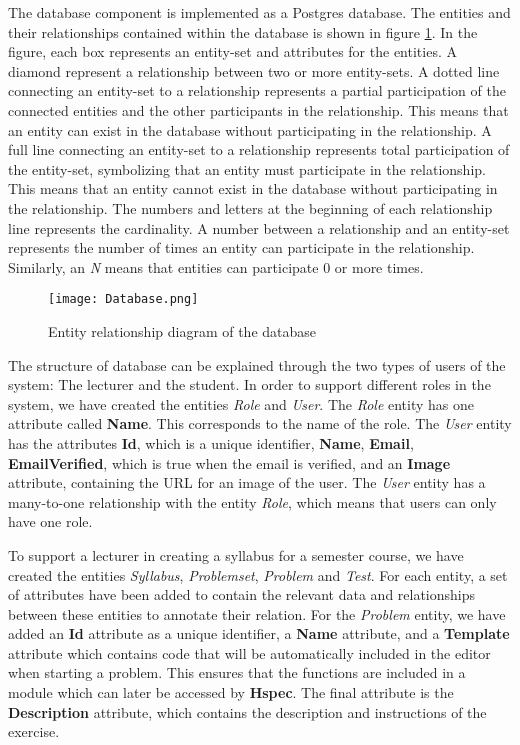 The database component is implemented as a Postgres database. The entities and their relationships contained within the database is shown in figure \ref{fig:Database}. In the figure, each box represents an entity-set and attributes for the entities. A diamond represent a relationship between two or more entity-sets.
A dotted line connecting an entity-set to a relationship represents a partial participation of the connected entities and the other participants in the relationship. This means that an entity can exist in the database without participating in the relationship.
A full line connecting an entity-set to a relationship represents total participation of the entity-set, symbolizing that an entity must participate in the relationship.
This means that an entity cannot exist in the database without participating in the relationship.
The numbers and letters at the beginning of each relationship line represents the cardinality. A number between a relationship and an entity-set represents the number of times an entity can participate in the relationship. Similarly, an \textit{N} means that entities can participate $0$ or more times.

\begin{figure}[H]
	\texttt{[image: Database.png]}
	\centering
	\caption{Entity relationship diagram of the database}
	\label{fig:Database}
\end{figure}

The structure of database can be explained through the two types of users of the system: The lecturer and the student.
In order to support different roles in the system, we have created the entities \textit{Role} and \textit{User}. The \textit{Role} entity has one attribute called \textbf{Name}. This corresponds to the name of the role. The \textit{User} entity has the attributes \textbf{Id}, which is a unique identifier, \textbf{Name}, \textbf{Email}, \textbf{EmailVerified}, which is true when the email is verified, and an \textbf{Image} attribute, containing the URL for an image of the user. The \textit{User} entity has a many-to-one relationship with the entity \textit{Role}, which means that users can only have one role.

To support a lecturer in creating a syllabus for a semester course, we have created the entities \textit{Syllabus}, \textit{Problemset}, \textit{Problem} and \textit{Test}. For each entity, a set of attributes have been added to contain the relevant data and relationships between these entities to annotate their relation.
For the \textit{Problem} entity, we have added an \textbf{Id} attribute as a unique identifier, a \textbf{Name} attribute, and a \textbf{Template} attribute which contains code that will be automatically included in the editor when starting a problem. This ensures that the functions are included in a module which can later be accessed by \textbf{Hspec}. The final attribute is the \textbf{Description} attribute, which contains the description and instructions of the exercise.

